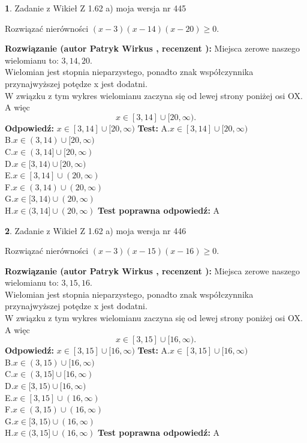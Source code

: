 \documentclass[12pt, a4paper]{article}
\theoremstyle{definition} %
\newtheorem{zad}{}
\newcommand{\zadStart}[1]{\begin{zad}#1\newline}
\newcommand{\zadStop}{\end{zad}}
\newcommand{\rozwStart}[2]{\noindent \textbf{Rozwiązanie (autor #1 , recenzent #2): }\newline}
\newcommand{\rozwStop}{\newline}
\newcommand{\odpStart}{\noindent \textbf{Odpowiedź:}\newline}
\newcommand{\odpStop}{\newline}
\newcommand{\testStart}{\noindent \textbf{Test:}\newline}
\newcommand{\testStop}{\newline}
\newcommand{\kluczStart}{\noindent \textbf{Test poprawna odpowiedź:}\newline}
\newcommand{\kluczStop}{\newline}
\begin{document}
\zadStart{Zadanie z Wikieł Z 1.62 a) moja wersja nr 445}

Rozwiązać nierówności $(x-3)(x-14)(x-20)\ge0$.
\zadStop
\rozwStart{Patryk Wirkus}{}
Miejsca zerowe naszego wielomianu to: $3, 14, 20$.\\
Wielomian jest stopnia nieparzystego, ponadto znak współczynnika przy\linebreak najwyższej potędze x jest dodatni.\\ W związku z tym wykres wielomianu zaczyna się od lewej strony poniżej osi OX. A więc $$x \in [3,14] \cup [20,\infty).$$
\rozwStop
\odpStart
$x \in [3,14] \cup [20,\infty)$
\odpStop
\testStart
A.$x \in [3,14] \cup [20,\infty)$\\
B.$x \in (3,14) \cup [20,\infty)$\\
C.$x \in (3,14] \cup [20,\infty)$\\
D.$x \in [3,14) \cup [20,\infty)$\\
E.$x \in [3,14] \cup (20,\infty)$\\
F.$x \in (3,14) \cup (20,\infty)$\\
G.$x \in [3,14) \cup (20,\infty)$\\
H.$x \in (3,14] \cup (20,\infty)$
\testStop
\kluczStart
A
\kluczStop



\zadStart{Zadanie z Wikieł Z 1.62 a) moja wersja nr 446}

Rozwiązać nierówności $(x-3)(x-15)(x-16)\ge0$.
\zadStop
\rozwStart{Patryk Wirkus}{}
Miejsca zerowe naszego wielomianu to: $3, 15, 16$.\\
Wielomian jest stopnia nieparzystego, ponadto znak współczynnika przy\linebreak najwyższej potędze x jest dodatni.\\ W związku z tym wykres wielomianu zaczyna się od lewej strony poniżej osi OX. A więc $$x \in [3,15] \cup [16,\infty).$$
\rozwStop
\odpStart
$x \in [3,15] \cup [16,\infty)$
\odpStop
\testStart
A.$x \in [3,15] \cup [16,\infty)$\\
B.$x \in (3,15) \cup [16,\infty)$\\
C.$x \in (3,15] \cup [16,\infty)$\\
D.$x \in [3,15) \cup [16,\infty)$\\
E.$x \in [3,15] \cup (16,\infty)$\\
F.$x \in (3,15) \cup (16,\infty)$\\
G.$x \in [3,15) \cup (16,\infty)$\\
H.$x \in (3,15] \cup (16,\infty)$
\testStop
\kluczStart
A
\kluczStop
\end{document}

